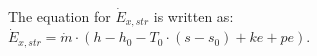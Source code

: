 The equation for \( \dot{E}_{x,str} \) is written as:  
\( \dot{E}_{x,str} = \dot{m} \cdot (h - h_0 - T_0 \cdot (s - s_0) + ke + pe) \).